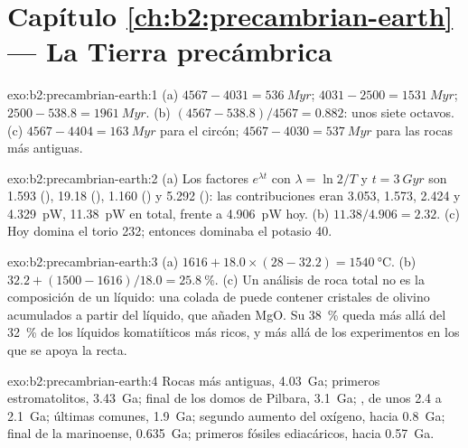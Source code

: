 \section*{Capítulo \ref{ch:b2:precambrian-earth} --- La Tierra precámbrica}

\begin{solution}{exo:b2:precambrian-earth:1}
(a)  $4567 - 4031 = \qty{536}{Myr}$;  $4031 - 2500 = \qty{1531}{Myr}$;
 $2500 - 538.8 = \qty{1961}{Myr}$. (b) $(4567 - 538.8)/4567 = 0.882$: unos siete
octavos. (c) $4567 - 4404 = \qty{163}{Myr}$ para el circón; $4567 - 4030 = \qty{537}{Myr}$ para
las rocas más antiguas.
\end{solution}

\begin{solution}{exo:b2:precambrian-earth:2}
(a) Los factores $e^{\lambda t}$ con $\lambda = \ln2/T$ y $t = \qty{3}{Gyr}$ son 1.593
(), 19.18 (), 1.160 () y 5.292 (): las
contribuciones eran 3.053, 1.573, 2.424 y \qty{4.329}{pW}, \qty{11.38}{pW} en total, frente a
\qty{4.906}{pW} hoy. (b) $11.38/4.906 = 2.32$. (c) Hoy domina el torio 232; entonces dominaba el
potasio 40.
\end{solution}

\begin{solution}{exo:b2:precambrian-earth:3}
(a) $1616 + 18.0\times(28 - 32.2) = \qty{1540}{\celsius}$. (b) $32.2 + (1500 - 1616)/18.0 =
\qty{25.8}{\percent}$. (c) Un análisis de roca total no es la composición de un líquido: una
colada de  puede contener cristales de olivino acumulados a partir del líquido, que añaden MgO. Su
\qty{38}{\percent} queda más allá del \qty{32}{\percent} de los líquidos komatiíticos más ricos, y
más allá de los experimentos en los que se apoya la recta.
\end{solution}

\begin{solution}{exo:b2:precambrian-earth:4}
Rocas más antiguas, \qty{4.03}{Ga}; primeros estromatolitos, \qty{3.43}{Ga}; final de los domos de Pilbara,
\qty{3.1}{Ga}; , de unos 2.4 a \qty{2.1}{Ga}; últimas  comunes,
\qty{1.9}{Ga}; segundo aumento del oxígeno, hacia \qty{0.8}{Ga}; final de la marinoense,
\qty{0.635}{Ga}; primeros fósiles ediacáricos, hacia \qty{0.57}{Ga}.
\end{solution}

